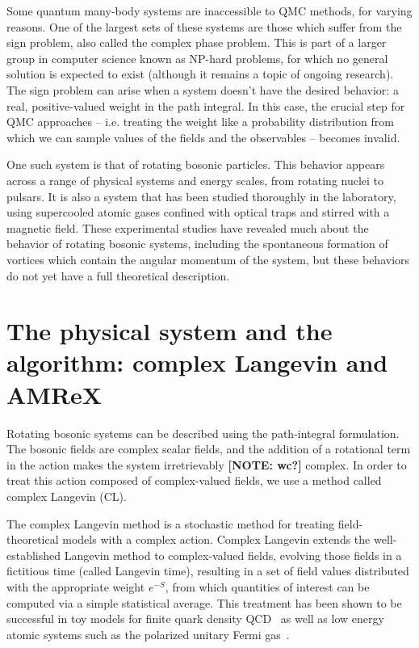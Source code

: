 \documentclass[onecolumn, 12pt]{report}
\newcommand{\cb}[1]{{\color{red} \bf[NOTE: #1]}}
\begin{document}
Some quantum many-body systems are inaccessible to QMC methods, for varying reasons. One of the largest sets of these systems are those which suffer from the sign problem, also called the complex phase problem. This is part of a larger group in computer science known as NP-hard problems, for which no general solution is expected to exist (although it remains a topic of ongoing research). The sign problem can arise when a system doesn't have the desired behavior: a real, positive-valued weight in the path integral. In this case, the crucial step for QMC approaches -- i.e. treating the weight like a probability distribution from which we can sample values of the fields and the observables -- becomes invalid.

One such system is that of rotating bosonic particles. This behavior appears across a range of physical systems and energy scales, from rotating nuclei to pulsars. It is also a system that has been studied thoroughly in the laboratory, using supercooled atomic gases confined with optical traps and stirred with a magnetic field. These experimental studies have revealed much about the behavior of rotating bosonic systems, including the spontaneous formation of vortices which contain the angular momentum of the system, but these behaviors do not yet have a full theoretical description.

\section{The physical system and the algorithm: complex Langevin and AMReX}
Rotating bosonic systems can be described using the path-integral formulation. The bosonic fields are complex scalar fields, and the addition of a rotational term in the action makes the system irretrievably \cb{wc?} complex. In order to treat this action composed of complex-valued fields, we use a method called complex Langevin (CL). 

The complex Langevin method is a stochastic method for treating field-theoretical models with a complex action. Complex Langevin extends the well-established Langevin method to complex-valued fields, evolving those fields in a fictitious time (called Langevin time), resulting in a set of field values distributed with the appropriate weight $e^{-S}$, from which quantities of interest can be computed via a simple statistical average. This treatment has been shown to be successful in toy models for finite quark density QCD~\cite{BergerCLReview} as well as low energy atomic systems such as the polarized unitary Fermi gas~\cite{BergerCLReview}. 
\end{document}
